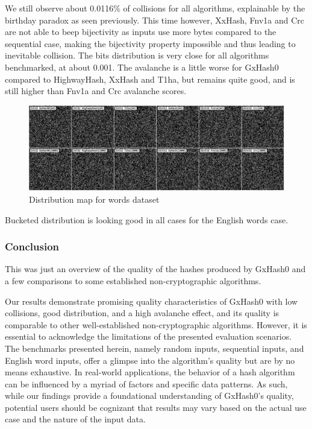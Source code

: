 \documentclass[10pt]{article}
\begin{document}
We still observe about 0.0116\% of collisions for all algorithms, explainable by the birthday paradox as seen previously. This time however, XxHash\cite{xxhash}, Fnv1a and Crc are not able to beep bijectivity as inputs use more bytes compared to the sequential case, making the bijectivity property impossible and thus leading to inevitable collision.
The bits distribution is very close for all algorithms benchmarked, at about 0.001. The avalanche is a little worse for GxHash0 compared to HighwayHash\cite{highwayhash}, XxHash\cite{xxhash} and T1ha\cite{rust-t1ha}, but remains quite good, and is still higher than Fnv1a and Crc avalanche scores.

\begin{figure}[H]
\centering
\includegraphics[width=1\textwidth]{quality-markov.png}
\caption{Distribution map for words dataset}
\label{fig:quality-sequential}
\end{figure}

Bucketed distribution is looking good in all cases for the English words case.

\subsubsection{Conclusion}

This was just an overview of the quality of the hashes produced by GxHash0 and a few comparisons to some established non-cryptographic algorithms. 

Our results demonstrate promising quality characteristics of GxHash0 with low collisions, good distribution, and a high avalanche effect, and its quality is comparable to other well-established non-cryptographic algorithms. However, it is essential to acknowledge the limitations of the presented evaluation scenarios. The benchmarks presented herein, namely random inputs, sequential inputs, and English word inputs, offer a glimpse into the algorithm's quality but are by no means exhaustive. In real-world applications, the behavior of a hash algorithm can be influenced by a myriad of factors and specific data patterns. As such, while our findings provide a foundational understanding of GxHash0's quality, potential users should be cognizant that results may vary based on the actual use case and the nature of the input data.
\end{document}
